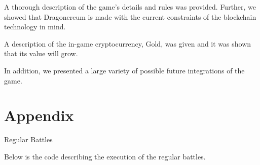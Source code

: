 \documentclass[12pt]{article}
\begin{document}
A thorough description of the game’s details and rules was provided. Further, we showed that Dragonereum is made with the current constraints of the blockchain technology in mind.\par

A description of the in-game cryptocurrency, Gold, was given and it was shown that its value will grow.  \par

In addition, we presented a large variety of possible future integrations of the game.\par

\vspace{\baselineskip}

 

\newpage
\printbibliography

\newpage
\section*{Appendix}


  \begin{Large}
  {Regular Battles}%
  \end{Large}


\vspace{\baselineskip}
Below is the code describing the execution of the regular battles.\par
\end{document}
